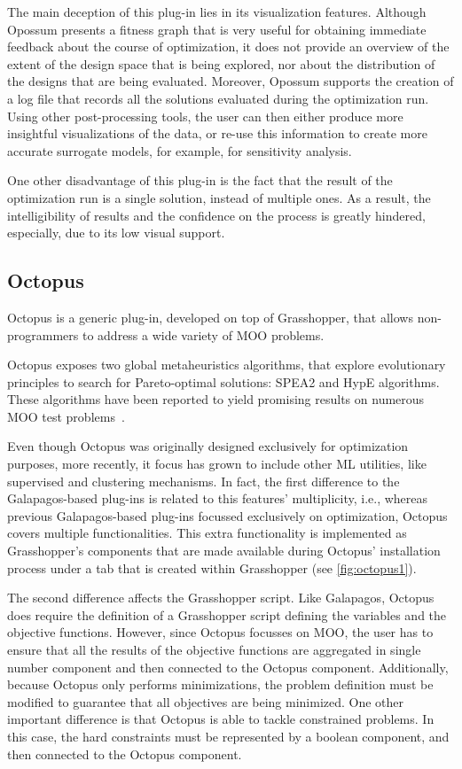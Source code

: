 	The main deception of this plug-in lies in its visualization features. Although Opossum presents a fitness graph that is very useful for obtaining immediate feedback about the course of optimization, it does not provide an overview of the extent of the design space that is being explored, nor about the distribution of the designs that are being evaluated. Moreover, Opossum supports the creation of a log file that records all the solutions evaluated during the optimization run. Using other post-processing tools, the user can then either produce more insightful visualizations of the data, or re-use this information to create more accurate surrogate models, for example, for sensitivity analysis.
	
	One other disadvantage of this plug-in is the fact that the result of the optimization run is a single solution, instead of multiple ones. As a result, the intelligibility of results and the confidence on the process is greatly hindered, especially, due to its low visual support. 
	
	\subsection{Octopus}
	
	Octopus \cite{OCTOPUS} is a generic plug-in, developed on top of Grasshopper, that allows non-programmers to address a wide variety of \ac{MOO} problems. 
	
	Octopus exposes two global metaheuristics algorithms, that explore evolutionary principles to search for Pareto-optimal solutions: \ac{SPEA2} and \ac{HypE} algorithms. These algorithms have been reported to yield promising results on numerous \ac{MOO} test problems~\cite{Zitzler2001SPEA2,Zitzler2011HypE}. 
	
	Even though Octopus was originally designed exclusively for optimization purposes, more recently, it focus has grown to include other \ac{ML} utilities, like supervised and clustering mechanisms. In fact, the first difference to the Galapagos-based plug-ins is related to this features' multiplicity, i.e., whereas previous Galapagos-based plug-ins focussed exclusively on optimization, Octopus covers multiple functionalities. This extra functionality is implemented as Grasshopper's components that are made available during Octopus' installation process under a tab that is created within Grasshopper (see \cref{fig:octopus1}).
	
	The second difference affects the Grasshopper script. Like Galapagos, Octopus does require the definition of a Grasshopper script defining the variables and the objective functions. However, since Octopus focusses on \ac{MOO}, the user has to ensure that all the results of the objective functions are aggregated in single number component and then connected to the Octopus component. Additionally, because Octopus only performs minimizations, the problem definition must be modified to guarantee that all objectives are being minimized. One other important difference is that Octopus is able to tackle constrained problems. In this case, the hard constraints must be represented by a boolean component, and then connected to the Octopus component.
	
